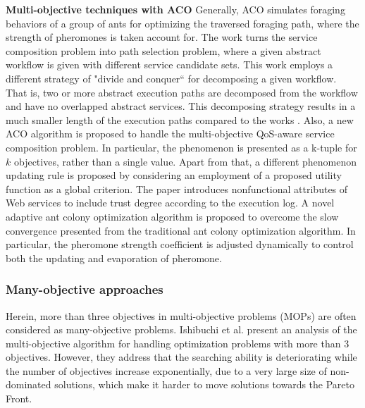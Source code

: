\textbf{Multi-objective techniques with ACO} Generally, ACO simulates foraging behaviors of a group of ants for optimizing the traversed foraging path, where the strength of pheromones is taken account for. The work \cite{zhang2010qos} turns the service composition problem into path selection problem, where a given abstract workflow is given with different service candidate sets. This work employs a different strategy of "divide and conquer`` for decomposing a given workflow. That is,  two or more abstract execution paths are decomposed from the workflow and have no overlapped abstract services. This decomposing strategy results in a much smaller length of the execution paths compared to the works \cite{yu2007efficient}.  Also, a new ACO algorithm is proposed to handle the multi-objective QoS-aware service composition problem. In particular,  the phenomenon is presented as a k-tuple for $k$ objectives, rather than a single value. Apart from that, a different phenomenon updating rule is proposed by considering an employment of a proposed utility function as a global criterion. The paper \cite{wang2014novel} introduces nonfunctional attributes of Web services to include trust degree according to the execution log. A novel adaptive ant colony optimization algorithm is proposed to overcome the slow convergence presented from the traditional ant colony optimization algorithm. In particular, the pheromone strength coefficient is adjusted dynamically to control both the updating and evaporation of pheromone. 

\subsubsection{Many-objective approaches}\label{ManyObjective}

Herein, more than three objectives in multi-objective problems (MOPs) are often considered as many-objective problems. Ishibuchi et al. \cite{ishibuchi2008evolutionary} present an analysis of the multi-objective algorithm for handling optimization problems with more than 3 objectives. However, they address that the searching ability is deteriorating while the number of objectives increase exponentially, due to a very large size of non-dominated solutions, which make it harder to move solutions towards the Pareto Front.

